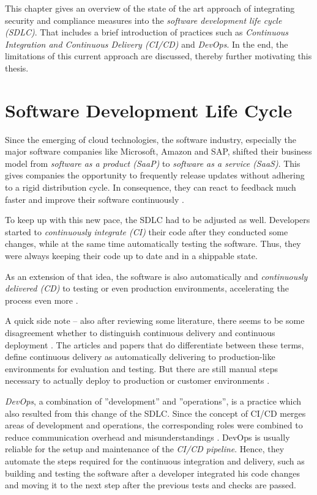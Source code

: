 
This chapter gives an overview of the state of the art approach of integrating security and compliance measures into the \textit{software development life cycle (SDLC)}. That includes a brief introduction of practices such as \textit{Continuous Integration and Continuous Delivery (CI/CD)} and \textit{DevOps}. In the end, the limitations of this current approach are discussed, thereby further motivating this thesis. 

\section{Software Development Life Cycle}
Since the emerging of cloud technologies, the software industry, especially the major software companies like Microsoft, Amazon and SAP, shifted their business model from \textit{software as a product (SaaP)} to \textit{software as a service (SaaS)}. This gives companies the opportunity to frequently release updates without adhering to a rigid distribution cycle. In consequence, they can react to feedback much faster and improve their software continuously \cite{DevSecOps, ContinuousSecurity}.\par
To keep up with this new pace, the SDLC had to be adjusted as well. Developers started to \emph{continuously integrate (CI)} their code after they conducted some changes, while at the same time automatically testing the software. Thus, they were always keeping their code up to date and in a shippable state.\par
As an extension of that idea, the software is also automatically and \emph{continuously delivered (CD)} to testing or even production environments, accelerating the process even more \cite{CICD}.\par 
A quick side note -- also after reviewing some literature, there seems to be some disagreement whether to distinguish continuous delivery and continuous deployment \cite{CICD, DevSecOps}. The articles and papers that do differentiate between these terms, define continuous delivery as automatically delivering to production-like environments for evaluation and testing. But there are still manual steps necessary to actually deploy to production or customer environments \cite{CICD, CICDDebate1, SecureCloudApplications}.\par
\emph{DevOps}, a combination of ''development'' and ''operations'', is a practice which also resulted from this change of the SDLC. Since the concept of CI/CD merges areas of development and operations, the corresponding roles were combined to reduce communication overhead and misunderstandings \cite{SecureCloudApplications}. DevOps is usually reliable for the setup and maintenance of the \emph{CI/CD pipeline}. Hence, they automate the steps required for the continuous integration and delivery, such as building and testing the software after a developer integrated his code changes and moving it to the next step after the previous tests and checks are passed. 

